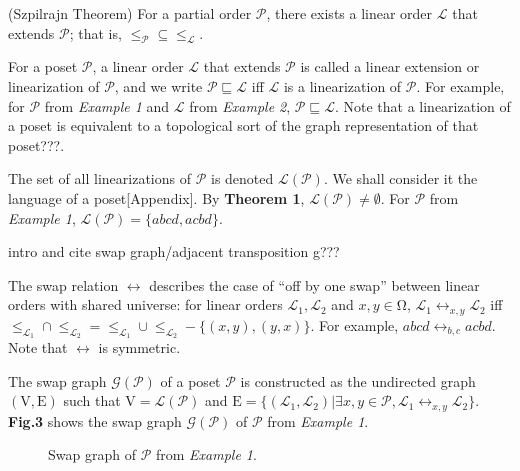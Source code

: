 \documentclass{llncs}
\begin{document}
\begin{theorem}
    (Szpilrajn Theorem) For a partial order $\mathcal{P}$, there exists a linear order $\mathcal{L}$ that extends $\mathcal{P}$; that is, $\leq_{\mathcal{P}} \subseteq \leq_{\mathcal{L}}$.
\end{theorem}

For a poset $\mathcal{P}$, a linear order $\mathcal{L}$ that extends $\mathcal{P}$ is called a linear extension or linearization of $\mathcal{P}$, and we write $\mathcal{P} \sqsubseteq \mathcal{L}$ iff $\mathcal{L}$ is a linearization of $\mathcal{P}$. For example, for $\mathcal{P}$ from \textit{Example 1} and $\mathcal{L}$ from \textit{Example 2}, $\mathcal{P} \sqsubseteq \mathcal{L}$. Note that a linearization of a poset is equivalent to a topological sort of the graph representation of that poset???.

The set of all linearizations of $\mathcal{P}$ is denoted $\mathcal{L}(\mathcal{P})$. We shall consider it the language of a poset[Appendix]. By \textbf{Theorem 1}, $\mathcal{L}(\mathcal{P}) \neq \emptyset$. For $\mathcal{P}$ from \textit{Example 1}, $\mathcal{L}(\mathcal{P}) = \{abcd, acbd\}$.

intro and cite swap graph/adjacent transposition g???

The swap relation $\leftrightarrow$ describes the case of ``off by one swap'' between linear orders with shared universe: for linear orders $\mathcal{L}_{1}, \mathcal{L}_{2}$ and $x, y \in \mathrm{\Omega}$, $\mathcal{L}_{1} \leftrightarrow_{x, y} \mathcal{L}_{2}$ iff $\leq_{\mathcal{L}_{1}} \cap \leq_{\mathcal{L}_{2}} = \leq_{\mathcal{L}_{1}} \cup \leq_{\mathcal{L}_{2}} - \{(x,y),(y,x)\}$. For example, $abcd \leftrightarrow_{b, c} acbd$. Note that $\leftrightarrow$ is symmetric.

The swap graph $\mathcal{G}(\mathcal{P})$ of a poset $\mathcal{P}$ is constructed as the undirected graph $(\mathrm{V},\mathrm{E})$ such that $\mathrm{V} = \mathcal{L}(\mathcal{P})$ and $\mathrm{E} = \{(\mathcal{L}_{1}, \mathcal{L}_{2}) | \exists x,y \in \mathcal{P}, \mathcal{L}_{1} \leftrightarrow_{x, y} \mathcal{L}_{2}\}$. \textbf{Fig.3} shows the swap graph $\mathcal{G}(\mathcal{P})$ of $\mathcal{P}$ from \textit{Example 1}.


\begin{figure}
\centering
\vspace{1cm}
\caption{Swap graph of $\mathcal{P}$ from \textit{Example 1}.}
\end{figure}
\end{document}
